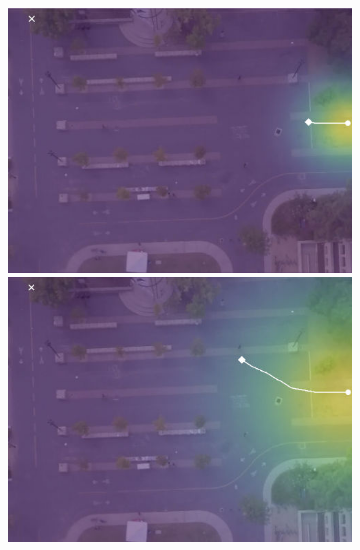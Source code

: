\documentclass[usenames,dvipsnames]{article}
\begin{document}
\begin{enumerate}
\begin{item}
\begin{figure}[t!]
\begin{subfigure}[t]{0.5\textwidth}
	\vspace{0.1cm}
	\begin{minipage}[c]{0.45cm}
	\end{minipage}
	\begin{minipage}[c]{0.3\linewidth}
		\includegraphics[width=\linewidth]{./figures/bookstore/rand_1_2_t=50.jpg}
	\end{minipage}
	\begin{minipage}[c]{0.3\linewidth}
		\includegraphics[width=\linewidth]{./figures/bookstore/rand_1_2_t=130.jpg}
	\end{minipage}
	\begin{minipage}[c]{0.3\linewidth}

\end{minipage}
\end{subfigure}
\end{figure}
\end{item}
\end{enumerate}
\end{document}
